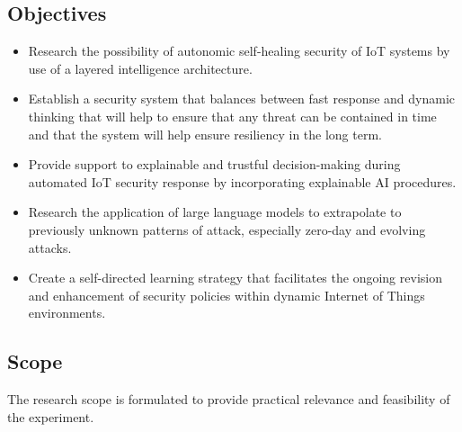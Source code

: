 \subsection{Objectives}
\begin{itemize}
	\item Research the possibility of autonomic self-healing security of IoT systems by use of a layered intelligence architecture.
	\item Establish a security system that balances between fast response and dynamic thinking that will help to ensure that any threat can be contained in time and that the system will help ensure resiliency in the long term.
	\item Provide support to explainable and trustful decision-making during automated IoT security response by incorporating explainable AI procedures.
	\item Research the application of large language models to extrapolate to previously unknown patterns of attack, especially zero-day and evolving attacks.
	\item Create a self-directed learning strategy that facilitates the ongoing revision and enhancement of security policies within dynamic Internet of Things environments.
\end{itemize}

\subsection{Scope}

The research scope is formulated to provide practical relevance and feasibility of the experiment.

